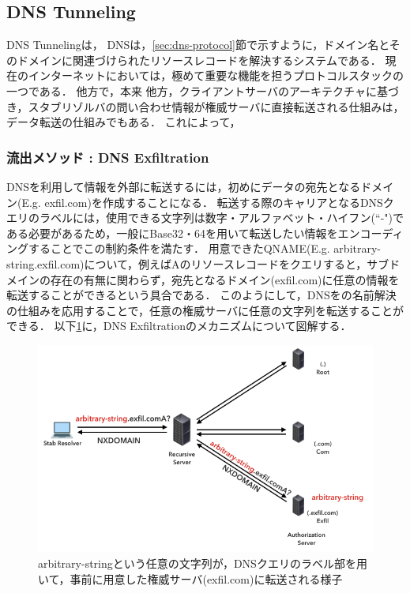 \subsection{DNS Tunneling}
DNS Tunnelingは，
DNSは，\ref{sec:dns-protocol}節で示すように，ドメイン名とそのドメインに関連づけられたリソースレコードを解決するシステムである．
現在のインターネットにおいては，極めて重要な機能を担うプロトコルスタックの一つである．
他方で，本来
他方，クライアントサーバのアーキテクチャに基づき，スタブリゾルバの問い合わせ情報が権威サーバに直接転送される仕組みは，データ転送の仕組みでもある．
これによって，

\subsubsection{流出メソッド : DNS Exfiltration}
\label{sec:dns-exfiltration}
DNSを利用して情報を外部に転送するには，初めにデータの宛先となるドメイン(E.g. exfil.com)を作成することになる．
転送する際のキャリアとなるDNSクエリのラベルには，使用できる文字列は数字・アルファベット・ハイフン(``-")である必要があるため，一般にBase32・64を用いて転送したい情報をエンコーディングすることでこの制約条件を満たす．
用意できたQNAME(E.g. arbitrary-string.exfil.com)について，例えばAのリソースレコードをクエリすると，サブドメインの存在の有無に関わらず，宛先となるドメイン(exfil.com)に任意の情報を転送することができるという具合である．
このようにして，DNSをの名前解決の仕組みを応用することで，任意の権威サーバに任意の文字列を転送することができる．
以下\ref{fig:dns-exfiltration}に，DNS Exfiltrationのメカニズムについて図解する．

\begin{figure}[h]
 \centering
 \includegraphics[width=12.0cm]{figure/dns-exfiltration.png}
 \caption{arbitrary-stringという任意の文字列が，DNSクエリのラベル部を用いて，事前に用意した権威サーバ(exfil.com)に転送される様子}
 \label{fig:dns-exfiltration}
\end{figure}

